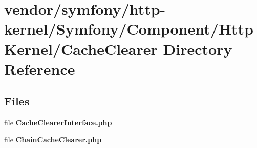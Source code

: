 \section{vendor/symfony/http-\/kernel/\+Symfony/\+Component/\+Http\+Kernel/\+Cache\+Clearer Directory Reference}
\label{dir_8e4c3de35384cce3add520619e64e558}
\subsection*{Files}
\begin{DoxyCompactItemize}
\item 
file {\bf Cache\+Clearer\+Interface.\+php}
\item 
file {\bf Chain\+Cache\+Clearer.\+php}
\end{DoxyCompactItemize}

